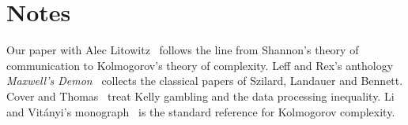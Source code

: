 

\section*{Notes}

Our paper with Alec Litowitz~\cite{litowitz2026} follows the line from Shannon's theory of communication to Kolmogorov's theory of complexity. Leff and Rex's anthology \emph{Maxwell's Demon}~\cite{leffrex1990} collects the classical papers of Szilard, Landauer and Bennett. Cover and Thomas~\cite{covertomas} treat Kelly gambling and the data processing inequality. Li and Vit\'anyi's monograph~\cite{livitanyi2008} is the standard reference for Kolmogorov complexity.
